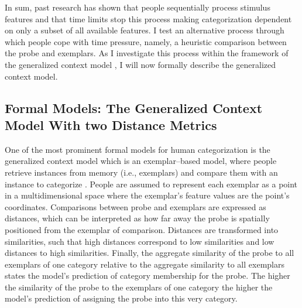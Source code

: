 \documentclass[a4paper,man,natbib]{apa6}
\begin{document}

In sum, past research has shown that people sequentially process stimulus features and that time limits stop this process making categorization dependent on only a subset of all available features. I test an alternative process through which people cope with time pressure, namely, a heuristic comparison between the probe and exemplars. As I investigate this process within the framework of the generalized context model \citep{nosofsky1986attention}, I will now formally describe the generalized context model.

\subsection{Formal Models: The Generalized Context Model With two Distance Metrics}
One of the most prominent formal models for human categorization is the generalized context model \citep{nosofsky1984choice, nosofsky1986attention, nosofsky2011generalized} which is an exemplar--based model, where people retrieve instances from memory (i.e., exemplars) and compare them with an instance to categorize \citep[i.e., the probe;][]{medin1978context}. People are assumed to represent each exemplar as a point in a multidimensional space where the exemplar's feature values are the point's coordinates. Comparisons between probe and exemplars are expressed as distances, which can be interpreted as how far away the probe is spatially positioned from the exemplar of comparison. Distances are transformed into similarities, such that high distances correspond to low similarities and low distances to high similarities. Finally, the aggregate similarity of the probe to all exemplars of one category relative to the aggregate similarity to all exemplars states the model's prediction of category membership for the probe. The higher the similarity of the probe to the exemplars of one category the higher the model's prediction of assigning the probe into this very category. 
\end{document}
